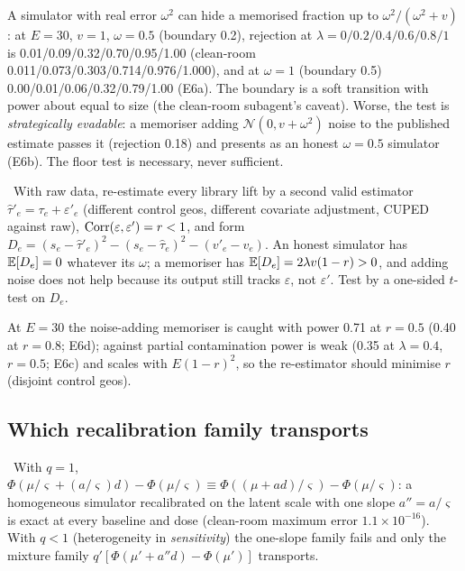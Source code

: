 A simulator with real error $\omega^2$ can hide a memorised fraction up to $\omega^2/(\omega^2 + v)$: at $E = 30$, $v = 1$, $\omega = 0.5$ (boundary 0.2), rejection at $\lambda = 0/0.2/0.4/0.6/0.8/1$ is 0.01/0.09/0.32/0.70/0.95/1.00 (clean-room 0.011/0.073/0.303/0.714/0.976/1.000), and at $\omega = 1$ (boundary 0.5) 0.00/0.01/0.06/0.32/0.79/1.00 (E6a). The boundary is a soft transition with power about equal to size (the clean-room subagent's caveat). Worse, the test is \emph{strategically evadable}: a memoriser adding $\mathcal N(0, v + \omega^2)$ noise to the published estimate passes it (rejection 0.18) and presents as an honest $\omega = 0.5$ simulator (E6b). The floor test is necessary, never sufficient.

\begin{construction}
\label{sim:con:reest}
\tagEstablished\ With raw data, re-estimate every library lift by a second valid estimator $\hat\tau'_e = \tau_e + \varepsilon'_e$ (different control geos, different covariate adjustment, CUPED against raw), $\operatorname{Corr}(\varepsilon, \varepsilon') = r < 1$, and form $D_e = (s_e - \hat\tau'_e)^2 - (s_e - \hat\tau_e)^2 - (v'_e - v_e)$. An honest simulator has $\mathbb{E}[D_e] = 0$ whatever its $\omega$; a memoriser has $\mathbb{E}[D_e] = 2\lambda v(1 - r) > 0$, and adding noise does not help because its output still tracks $\varepsilon$, not $\varepsilon'$. Test by a one-sided $t$-test on $D_e$.
\end{construction}

At $E = 30$ the noise-adding memoriser is caught with power 0.71 at $r = 0.5$ (0.40 at $r = 0.8$; E6d); against partial contamination power is weak (0.35 at $\lambda = 0.4$, $r = 0.5$; E6c) and scales with $E(1 - r)^2$, so the re-estimator should minimise $r$ (disjoint control geos).

\subsection{Which recalibration family transports}

\begin{proposition}
\label{sim:prop:latent}
\tagEstablished\ With $q = 1$, $\Phi(\mu/\varsigma + (a/\varsigma)d) - \Phi(\mu/\varsigma) \equiv \Phi((\mu + ad)/\varsigma) - \Phi(\mu/\varsigma)$: a homogeneous simulator recalibrated on the latent scale with one slope $a'' = a/\varsigma$ is exact at every baseline and dose (clean-room maximum error $1.1\times10^{-16}$). With $q < 1$ (heterogeneity in \emph{sensitivity}) the one-slope family fails and only the mixture family $q'[\Phi(\mu' + a''d) - \Phi(\mu')]$ transports.
\end{proposition}


